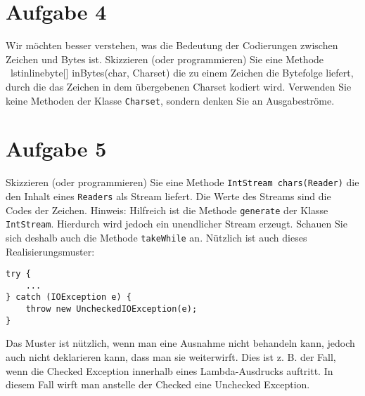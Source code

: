 \section{Aufgabe 4}
Wir möchten besser verstehen, was die Bedeutung der Codierungen zwischen Zeichen und Bytes
ist.
Skizzieren (oder programmieren) Sie eine Methode
\ lstinline{byte[] inBytes(char, Charset)}
die zu einem Zeichen die Bytefolge liefert, durch die das Zeichen in dem übergebenen Charset
kodiert wird.
Verwenden Sie keine Methoden der Klasse \lstinline{Charset}, sondern denken Sie an Ausgabeströme.

\section{Aufgabe 5}
Skizzieren (oder programmieren) Sie eine Methode
\lstinline{IntStream chars(Reader)}
die den Inhalt eines \lstinline{Readers} als Stream liefert. Die Werte des Streams sind die Codes der Zeichen.
Hinweis: Hilfreich ist die Methode \lstinline{generate} der Klasse \lstinline{IntStream}. Hierdurch wird jedoch ein
unendlicher Stream erzeugt. Schauen Sie sich deshalb auch die Methode \lstinline{takeWhile} an. Nützlich
ist auch dieses Realisierungsmuster:
\begin{lstlisting}
try {
    ...
} catch (IOException e) {
    throw new UncheckedIOException(e);
}
\end{lstlisting}
Das Muster ist nützlich, wenn man eine Ausnahme nicht behandeln kann, jedoch auch nicht deklarieren kann, dass man sie weiterwirft. Dies ist z. B. der Fall, wenn die Checked Exception innerhalb
eines Lambda-Ausdrucks auftritt. In diesem Fall wirft man anstelle der Checked eine Unchecked
Exception.